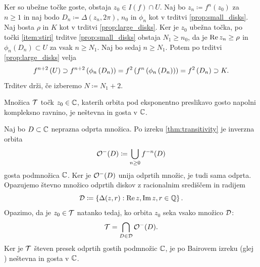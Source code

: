 \begin{dokaz}
    Ker so ubežne točke goste, obstaja \(z_0 \in I (f) \cap U\). Naj bo \(z_n \coloneq f^n (z_0)\) za \(n \geq 1\) in naj bodo \(D_n \coloneq \Delta (z_n, 2 \pi)\), \(n_0\) in \(\phi_n\) kot v trditvi \ref{prop:small_disks}. Naj bosta \(\rho\) in \(K\) kot v trditvi \ref{prop:large_disks}. Ker je \(z_0\) ubežna točka, po točki \ref{item:stiri} trditve \ref{prop:small_disks} obstaja \(N_1 \geq n_0\), da je \(\operatorname{Re} z_n \geq \rho\) in \(\phi_n (D_n) \subset U\) za vsak \(n \geq N_1\). Naj bo sedaj \(n \geq N_1\). Potem po trditvi \ref{prop:large_disks} velja
    \[f^{n + 2} \left( U \right) \supset f^{n + 2} \left( \phi_n \left( D_n \right) \right) = f^2 \left( f^n \left( \phi_n \left( D_n \right) \right) \right) = f^2 \left( D_n \right) \supset K.\]
    Trditev drži, če izberemo \(N \coloneq N_1 + 2\).
\end{dokaz}

\begin{posledica}
    Množica \(\mathcal T\) točk \(z_0 \in \mathbb C\), katerih orbita pod eksponentno preslikavo gosto napolni kompleksno ravnino, je neštevna in gosta v \(\mathbb C\).
\end{posledica}

\begin{dokaz}
    Naj bo \(D \subset \mathbb C\) neprazna odprta množica. Po izreku \ref{thm:transitivity} je inverzna orbita
    \[\mathcal O^- (D) \coloneq \bigcup_{n \geq 0} f^{- n} (D)\]
    gosta podmnožica \(\mathbb C\). Ker je \(\mathcal O^- (D)\) unija odprtih množic, je tudi sama odprta. Opazujemo števno množico odprtih diskov z racionalnim središčem in radijem
    \[\mathcal D \coloneq \left\{ \Delta (z, r) : \operatorname{Re} z, \operatorname{Im} z, r \in \mathbb Q \right\}.\]
    Opazimo, da je \(z_0 \in \mathcal T\) natanko tedaj, ko orbita \(z_0\) seka vsako množico \(\mathcal D\):
    \[\mathcal T = \bigcap_{D \in \mathcal D} \mathcal O^- (D).\]
    Ker je \(\mathcal T\) števen presek odprtih gostih podmnožic \(\mathbb C\), je po Bairovem izreku (glej \cite[izrek 5.6]{Rudin_1987}) neštevna in gosta v \(\mathbb C\).
\end{dokaz}